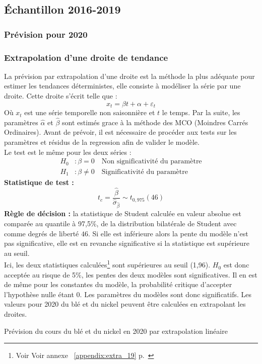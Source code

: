 \subsection{Échantillon 2016-2019}\label{prev1}
\subsubsection{Prévision pour 2020}
\subsubsection*{Extrapolation d'une droite de tendance} 
La prévision par extrapolation d'une droite est la méthode la plus adéquate pour estimer les tendances déterministes, elle consiste à modéliser la série par une droite.
Cette droite s'écrit telle que :
\begin{equation*}
    x_{t} = \beta t + \alpha + \varepsilon_{t}
\end{equation*}
Où $x_{t}$ est une série temporelle non saisonnière et $t$ le temps. Par la suite, les paramètres $\hat{\alpha}$ et $\hat{\beta}$ sont estimés grace à la méthode des MCO 
(Moindres Carrés Ordinaires). Avant de prévoir, il est nécessaire de procéder aux tests sur les paramètres et résidus de la regression afin de valider le modèle.\\[11pt]
Le test est le même pour les deux séries :
\begin{equation*}
    \begin{split}
        H_{0} &: \beta = 0     \quad \text{Non significativité du paramètre} \\
        H_{1} &: \beta \neq 0  \quad \text{Significativité du paramètre}
    \end{split}
\end{equation*}
\textbf{Statistique de test :} 
\begin{equation*}
    t_{c} = \frac{\hat{\beta}}{\hat{\sigma}_{\hat{\beta}}}\sim t_{0,975}(46)
\end{equation*}
\textbf{Règle de décision :}  la statistique de Student calculée en valeur absolue est comparée au quantile à 97,5\%, de la distribution bilatérale de Student avec comme 
degrés de liberté $46$. Si elle est inférieure alors la pente du modèle n'est pas significative, elle est en revanche significative si la statistique est 
supérieure au seuil.\\[11pt]
Ici, les deux statistiques calculées\footnote{Voir Voir annexe ~\ref{appendix:extra_19} p.~\pageref{appendix:extra_19}} sont 
supérieures au seuil (1,96). $H_{0}$ est donc acceptée au risque de 5\%, 
les pentes des deux modèles sont significatives. Il en est de même pour les constantes du modèle, la probabilité critique d'accepter l'hypothèse nulle étant 0. Les 
paramètres du modèles sont donc significatifs. Les valeurs pour 2020 du blé et du nickel peuvent être calculées en extrapolant les droites.
\begin{table}[H]
        \centering
        \caption{Prévision du cours du blé et du nickel en 2020 par extrapolation linéaire}
        \sffamily
        
\end{table}


